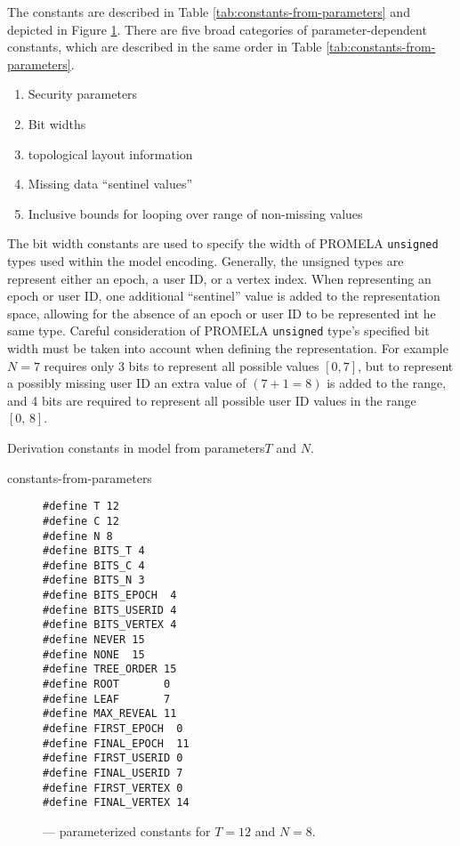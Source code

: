 The constants are described in Table \ref{tab:constants-from-parameters} and depicted in Figure \ref{fig:Encoded-Constants}.
There are five broad categories of parameter-dependent constants, which are described in the same order in Table \ref{tab:constants-from-parameters}.

\begin{enumerate}
\item Security parameters
\item Bit widths
\item {} topological layout information
\item Missing data ``sentinel values''
\item Inclusive bounds for looping over range of non-missing values
\end{enumerate}

The bit width constants are used to specify the width of PROMELA \texttt{unsigned} types used within the model encoding.
Generally, the unsigned types are represent either an epoch, a user ID, or a  vertex index.
When representing an epoch or user ID, one additional ``sentinel'' value is added to the representation space, allowing for the absence of an epoch or user ID to be represented int he same type.
Careful consideration of PROMELA \texttt{unsigned} type's specified bit width must be taken into account when defining the representation.
For example \(N=7\) requires only 3 bits to represent all possible values \([0,7]\), but to represent a possibly missing user ID an extra value of \((7 + 1 = 8)\) is added to the range, and 4 bits are required to represent all possible user ID values in the range \([0,\, 8]\).

\begin{table}[h!]
  \centering
  \caption{\label{tab:constants-from-parameters}Derivation constants in  model from parameters\(T\) and \(N\).}
  {constants-from-parameters}
\end{table}
    
\begin{figure}[h!]
  \centering
  \caption{\label{fig:Encoded-Constants}\CGKAmod{}{}{} --- parameterized constants for \(T=12\) and \(N=8\).}
\begin{verbatim}
#define T 12
#define C 12
#define N 8
#define BITS_T 4
#define BITS_C 4
#define BITS_N 3
#define BITS_EPOCH  4
#define BITS_USERID 4
#define BITS_VERTEX 4
#define NEVER 15
#define NONE  15
#define TREE_ORDER 15
#define ROOT       0
#define LEAF       7
#define MAX_REVEAL 11
#define FIRST_EPOCH  0
#define FINAL_EPOCH  11
#define FIRST_USERID 0
#define FINAL_USERID 7
#define FIRST_VERTEX 0
#define FINAL_VERTEX 14
\end{verbatim}
\end{figure}

